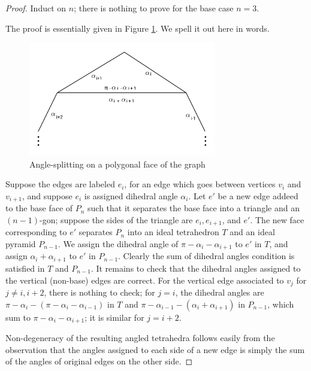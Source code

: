 \documentclass[11pt]{amsart}
\theoremstyle{plain}
\theoremstyle{definition}
\begin{document}
\begin{proof}
Induct on $n$; there is nothing to prove for the base case $n=3$.


The proof is essentially given in Figure \ref{f:ideal_pyramid_arg}.
We spell it out here in words.


\begin{figure}
\includegraphics[height=5cm]{more_pictures/angle_split.png}
\caption{Angle-splitting on a polygonal face of the graph}
\label{f:ideal_pyramid_arg}
\end{figure}


Suppose the edges are labeled $e_i$, for an edge
which goes between vertices $v_i$ and $v_{i+1}$,
and suppose $e_i$ is assigned dihedral angle $\alpha_i$.
Let $e'$ be a new edge addeed to the base face of $P_n$
such that it separates the base face into a triangle and
an $(n-1)$-gon;
suppose the sides of the triangle are
$e_i, e_{i+1}$, and $e'$.
The new face corresponding to $e'$ separates $P_n$ into
an ideal tetrahedron $T$ and an ideal pyramid $P_{n-1}$.
We assign the dihedral angle of $\pi - \alpha_i - \alpha_{i+1}$
to $e'$ in $T$, and assign $\alpha_i + \alpha_{i+1}$ to $e'$ in $P_{n-1}$.
Clearly the sum of dihedral angles condition is satisfied
in $T$ and $P_{n-1}$.
It remains to check that the dihedral angles assigned to the vertical (non-base)
edges are correct.
For the vertical edge associated to $v_j$ for $j \neq i, i+2$,
there is nothing to check;
for $j = i$, the dihedral angles are
$\pi - \alpha_i - (\pi - \alpha_i - \alpha_{i-1})$
in $T$ and $\pi - \alpha_{i-1} - (\alpha_i + \alpha_{i+1})$ in $P_{n-1}$,
which sum to $\pi - \alpha_i - \alpha_{i+1}$;
it is similar for $j = i+2$.


Non-degeneracy of the resulting angled tetrahedra
follows easily from the observation that the angles
assigned to each side of a new edge is simply the sum
of the angles of original edges on the other side.
\end{proof}


\end{document}
